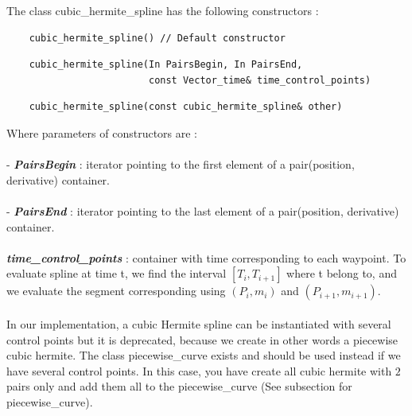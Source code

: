 \documentclass{article}
\begin{document}
    \noindent
    The class cubic\_hermite\_spline has the following constructors :
    \begin{lstlisting}
    cubic_hermite_spline() // Default constructor
    \end{lstlisting}
    \begin{lstlisting}
    cubic_hermite_spline(In PairsBegin, In PairsEnd, 
                         const Vector_time& time_control_points)
    \end{lstlisting}
    \begin{lstlisting}
    cubic_hermite_spline(const cubic_hermite_spline& other)
    \end{lstlisting}
    
    \noindent
    Where parameters of constructors are :\\\\
    - \textbf{\textit{PairsBegin}} : iterator pointing to the first element of a pair(position, derivative) container.\\\\
    - \textbf{\textit{PairsEnd}} : iterator pointing to the last element of a pair(position, derivative) container.\\\\
    \textbf{\textit{time\_control\_points}} : container with time corresponding to each waypoint. To evaluate spline at time t, we find the interval $[T_i,T_{i+1}]$ where t belong to, and we evaluate the segment corresponding using $(P_i,m_i)$ and $(P_{i+1},m_{i+1})$.\\\\
    
    In our implementation, a cubic Hermite spline can be instantiated with several control points but it is deprecated, because we create in other words a piecewise cubic hermite. The class piecewise\_curve exists and should be used instead if we have several control points. In this case, you have create all cubic hermite with $2$ pairs only and add them all to the piecewise\_curve (See subsection for piecewise\_curve).
    
\end{document}
